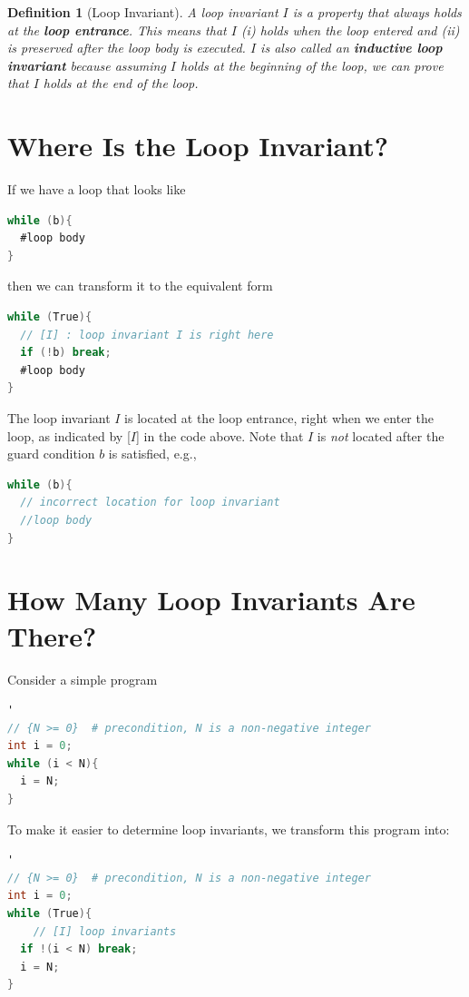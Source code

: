 \documentclass[oneside,11pt,dvipsnames]{book}
\newtheorem{definition}{Definition}[section]
\begin{document}
\begin{definition}[Loop Invariant]
A loop invariant $I$ is a property that always holds at the
\textbf{loop entrance}. This means that $I$ (i) holds when the
loop entered and (ii) is preserved after the loop body is executed. $I$ is also called an \textbf{inductive loop invariant} because assuming $I$ holds at the beginning of the loop, we can prove that $I$ holds at the end of the loop.
\end{definition}
\section{Where Is the Loop Invariant?}\label{where-is-the-loop-invariant}

If we have a loop that looks like

\begin{lstlisting}[language=C]
while (b){
  #loop body
}
\end{lstlisting}

\noindent then we can transform it to the equivalent form
\begin{lstlisting}[language=C]
while (True){
  // [I] : loop invariant I is right here
  if (!b) break;
  #loop body
}
\end{lstlisting}

The loop invariant $I$ is located at the loop entrance, right when we enter the loop, as
indicated by [$I$] in the code above.
Note that $I$ is \emph{not} located after the guard
condition $b$ is satisfied, e.g.,
\begin{lstlisting}[language=C]
while (b){
  // incorrect location for loop invariant
  //loop body
}
\end{lstlisting}


\section{How Many Loop Invariants Are There?}\label{sec:determining-loop-invariants}

Consider a simple
program

\begin{lstlisting}[language=C]'
// {N >= 0}  # precondition, N is a non-negative integer
int i = 0;
while (i < N){
  i = N;
}
\end{lstlisting}

To make it easier to determine loop invariants, we transform
this program into:

\begin{lstlisting}[language=C]'
// {N >= 0}  # precondition, N is a non-negative integer
int i = 0;
while (True){
    // [I] loop invariants 
  if !(i < N) break;
  i = N;
}
\end{lstlisting}
\end{document}
